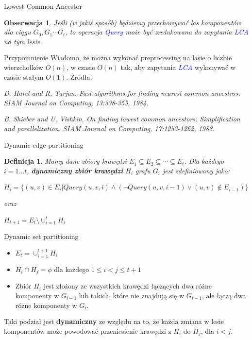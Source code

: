 \documentclass{beamer}
\newtheorem{df}{Definicja}
\newtheorem{obs}{Obserwacja}
\newcommand{\emp}[1]{\textcolor{blue}{\textit{#1}}}
\begin{document}
\begin{frame}{Lowest Common Ancestor}
\begin{obs}
Jeśli (w jakiś sposób) będziemy przechowywać las komponentów dla ciągu $G_0,G_1 \cdots G_t$, to operacja \emp{Query} może być zredukowana do zapytania \emp{LCA} na tym lesie.
\end{obs}

\begin{block}{Przypomnienie}
Wiadomo, że można wykonać preprocessing na lasie o liczbie wierzchołków \alert{$O(n)$}, w czasie \alert{$O(n)$} tak, aby zapytania \emp{LCA} wykonywać w czasie stałym \alert{$O(1)$}. Żródła:

\vspace{0.1cm}
{\small\textit{D. Harel and R. Tarjan. Fast algorithms for finding nearest common ancestros. SIAM Journal on Computing, 13:338-355, 1984.}}

\vspace{0.1cm}
{\small\textit{B. Shieber and U. Vishkin. On finding lowest common ancestors: Simplification and parallelization. SIAM Journal on Computing, 17:1253-1262, 1988.}}
\end{block}
\end{frame}

\begin{frame}{Dynamic edge partitioning}
\begin{df}
Mamy dane zbiory krawędzi $E_1 \subseteq E_2 \subseteq \cdots \subseteq E_t$. Dla każdego $i=1\dots t$, \textbf{dynamiczny zbiór krawędzi} $H_i$ grafu $G_i$ jest zdefiniowany jako:

\vspace{0.4cm}
{\small $H_i = \{(u,v)\in E_i | Query(u,v,i) \wedge (\neg Query(u,v,i-1) \vee (u,v) \notin E_{i-1})\}$}

\vspace{0.4cm}
oraz

\vspace{0.4cm}
{\small $H_{t+1} = E_t \setminus \cup^t_{i=1}H_i$}

\end{df}
\end{frame}

\begin{frame}{Dynamic set partitioning}
\begin{itemize}
\item $E_t = \cup^{t+1}_{i=1}H_i$
\item $H_i \cap H_j = \phi$ dla każdego $1 \leq i < j \leq t+1$
\item Zbiór $H_i$ jest złożony ze wszystkich krawędzi łączących dwa różne komponenty w $G_{i-1}$ lub takich, które nie znajdują się w $G_{i-1}$, ale łączą dwa różne komponenty w $G_i$.
\end{itemize}

\begin{block}{}
Taki podział jest \textbf{dynamiczny} ze względu na to, że każda zmiana w lesie komponentów może powodować przeniesienie krawędzi z $H_i$ do $H_j$, dla $i < j$.
\end{block}
\end{frame}
\end{document}
